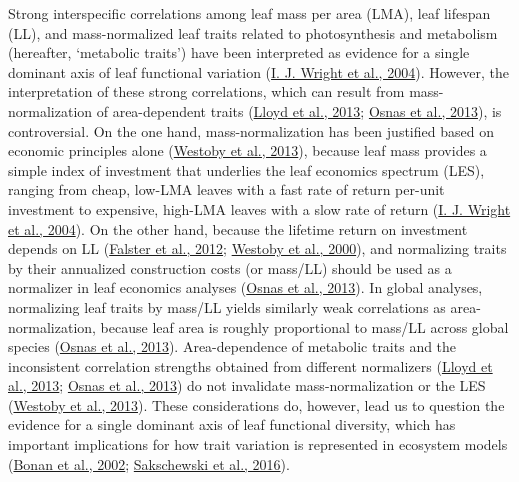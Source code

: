 \documentclass[
  12pt,
  letterpaper,
  DIV=11,
  numbers=noendperiod]{scrartcl}
\begin{document}
Strong interspecific correlations among leaf mass per area (LMA), leaf
lifespan (LL), and mass-normalized leaf traits related to photosynthesis
and metabolism (hereafter, `metabolic traits') have been interpreted as
evidence for a single dominant axis of leaf functional variation
(\protect\hyperlink{ref-Wright2004a}{I. J. Wright et al., 2004}).
However, the interpretation of these strong correlations, which can
result from mass-normalization of area-dependent traits
(\protect\hyperlink{ref-Lloyd2013}{Lloyd et al., 2013};
\protect\hyperlink{ref-Osnas2013}{Osnas et al., 2013}), is
controversial. On the one hand, mass-normalization has been justified
based on economic principles alone
(\protect\hyperlink{ref-Westoby2013}{Westoby et al., 2013}), because
leaf mass provides a simple index of investment that underlies the leaf
economics spectrum (LES), ranging from cheap, low-LMA leaves with a fast
rate of return per-unit investment to expensive, high-LMA leaves with a
slow rate of return (\protect\hyperlink{ref-Wright2004a}{I. J. Wright et
al., 2004}). On the other hand, because the lifetime return on
investment depends on LL (\protect\hyperlink{ref-Falster2012}{Falster et
al., 2012}; \protect\hyperlink{ref-Westoby2000}{Westoby et al., 2000}),
and normalizing traits by their annualized construction costs (or
mass/LL) should be used as a normalizer in leaf economics analyses
(\protect\hyperlink{ref-Osnas2013}{Osnas et al., 2013}). In global
analyses, normalizing leaf traits by mass/LL yields similarly weak
correlations as area-normalization, because leaf area is roughly
proportional to mass/LL across global species
(\protect\hyperlink{ref-Osnas2013}{Osnas et al., 2013}). Area-dependence
of metabolic traits and the inconsistent correlation strengths obtained
from different normalizers (\protect\hyperlink{ref-Lloyd2013}{Lloyd et
al., 2013}; \protect\hyperlink{ref-Osnas2013}{Osnas et al., 2013}) do
not invalidate mass-normalization or the LES
(\protect\hyperlink{ref-Westoby2013}{Westoby et al., 2013}). These
considerations do, however, lead us to question the evidence for a
single dominant axis of leaf functional diversity, which has important
implications for how trait variation is represented in ecosystem models
(\protect\hyperlink{ref-Bonan2002}{Bonan et al., 2002};
\protect\hyperlink{ref-Sakschewski2016}{Sakschewski et al., 2016}).
\end{document}
